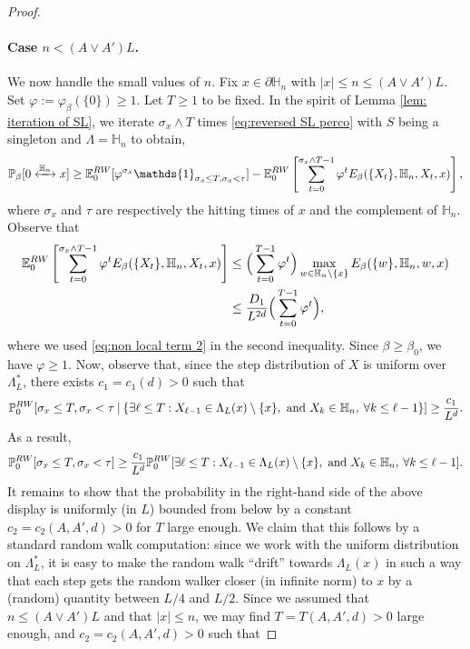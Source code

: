 \documentclass[11pt,a4paper]{article}
\numberwithin{equation}{section}
\theoremstyle{plain}
\theoremstyle{definition}
\newcommand{\connect}{\xleftrightarrow}
\begin{document}
\begin{proof}
\paragraph{Case $n<(A\vee A')L$.} We now handle the small values of $n$. Fix $x\in \partial\mathbb H_n$ with $|x|\leq n\leq (A\vee A')L$. Set $\varphi:=\varphi_\beta(\{0\})\geq 1$. Let $T\geq 1$ to be fixed. In the spirit of Lemma \ref{lem: iteration of SL}, we iterate $\sigma_x \wedge T$ times \eqref{eq:reversed SL perco} with $S$ being a singleton and $\Lambda=\mathbb H_n$ to obtain,
\begin{equation}\label{eq:lb half 1 small}
	\mathbb P_\beta[0\connect{\mathbb H_n\:}x]\geq \mathbb E^{\rm RW}_{0}[\varphi^{\sigma_x}\mathds{1}_{\sigma_x\leq T,\sigma_x<\tau}]-\mathbb E^{\rm RW}_0\left[\sum_{t=0}^{\sigma_x\wedge T-1}\varphi^t{E}_\beta(\{X_t\},\mathbb H_n,X_t,x)\right],
\end{equation}
where  $\sigma_x$ and $\tau$ are respectively the hitting times of $x$ and the complement of $\mathbb H_n$. Observe that
\begin{align}\notag
	\mathbb E^{\rm RW}_0\left[\sum_{t=0}^{\sigma_x\wedge T-1}\varphi^t{E}_\beta(\{X_t\},\mathbb H_n,X_t,x)\right]&\leq \Big(\sum_{t=0}^{T-1}\varphi^t\Big)\max_{w\in \mathbb H_n\setminus \{x\}}E_\beta(\{w\},\mathbb H_n,w,x)\\&\leq \frac{D_1}{L^{2d}}\Big(\sum_{t=0}^{T-1}\varphi^t\Big),
\end{align}
where we used \eqref{eq:non local term 2} in the second inequality. Since $\beta\geq \beta_0$, we have $\varphi\geq 1$. Now, observe that, since the step distribution of $X$ is uniform over $\Lambda_L^*$, there exists $c_1=c_1(d)>0$ such that
\begin{equation}
	\mathbb P_0^{\rm RW}[\sigma_x\leq T,\sigma_x<\tau \: | \: \{ \exists \ell\leq T: X_{\ell-1}\in \Lambda_{L}(x)\setminus\{x\}, \text{ and } X_k\in \mathbb H_n, \: \forall k\leq \ell-1\}]\geq \frac{c_1}{L^d}.
\end{equation}
As a result,
\begin{equation}
	\mathbb P_0^{\rm RW}[\sigma_x\leq T,\sigma_x<\tau]\geq \frac{c_1}{L^d}\mathbb P_0^{\rm RW}[\exists \ell\leq T: X_{\ell-1}\in \Lambda_{L}(x)\setminus\{x\}, \text{ and } X_k\in \mathbb H_n, \: \forall k\leq \ell-1].
\end{equation}
It remains to show that the probability in the right-hand side of the above display is uniformly (in $L$) bounded from below by a constant $c_2=c_2(A,A',d)>0$ for $T$ large enough. We claim that this follows by a standard random walk computation: since we work with the uniform distribution on $\Lambda^*_L$, it is easy to make the random walk ``drift'' towards $\Lambda_L(x)$ in such a way that each step gets the random walker closer (in infinite norm) to $x$ by a (random) quantity between $L/4$ and $L/2$. Since we assumed that $n\leq (A\vee A')L$ and that $|x|\leq n$, we may find $T=T(A,A',d)>0$ large enough, and $c_2=c_2(A,A',d)>0$ such that 

\end{proof}
\end{document}
